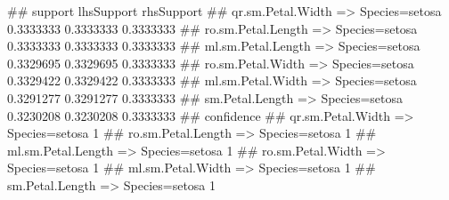 \begin{Schunk}
% --begin: "casestudy-assoc-searchrules"
\begin{Soutput}
##                                        support lhsSupport rhsSupport
## qr.sm.Petal.Width => Species=setosa  0.3333333  0.3333333  0.3333333
## ro.sm.Petal.Length => Species=setosa 0.3333333  0.3333333  0.3333333
## ml.sm.Petal.Length => Species=setosa 0.3329695  0.3329695  0.3333333
## ro.sm.Petal.Width => Species=setosa  0.3329422  0.3329422  0.3333333
## ml.sm.Petal.Width => Species=setosa  0.3291277  0.3291277  0.3333333
## sm.Petal.Length => Species=setosa    0.3230208  0.3230208  0.3333333
##                                      confidence
## qr.sm.Petal.Width => Species=setosa           1
## ro.sm.Petal.Length => Species=setosa          1
## ml.sm.Petal.Length => Species=setosa          1
## ro.sm.Petal.Width => Species=setosa           1
## ml.sm.Petal.Width => Species=setosa           1
## sm.Petal.Length => Species=setosa             1
\end{Soutput}
%
% --end: "casestudy-assoc-searchrules"
\end{Schunk}
